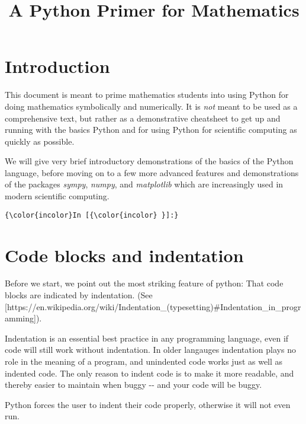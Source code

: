\documentclass{report}
\title{A Python Primer for Mathematics}
\begin{document}
    
    
    \maketitle
    
    
    \tableofcontents


    
\chapter{Introduction}\label{introduction}

This document is meant to prime mathematics students into using Python
for doing mathematics symbolically and numerically. It is \emph{not}
meant to be used as a comprehensive text, but rather as a demonstrative
cheatsheet to get up and running with the basics Python and for using
Python for scientific computing as quickly as possible.

We will give very brief introductory demonstrations of the basics of the
Python language, before moving on to a few more advanced features and
demonstrations of the packages \emph{sympy}, \emph{numpy}, and
\emph{matplotlib} which are increasingly used in modern scientific
computing.

    \begin{Verbatim}[commandchars=\\\{\}]
{\color{incolor}In [{\color{incolor} }]:} 
\end{Verbatim}

\chapter{Code blocks and indentation}\label{code-blocks-and-indentation}

Before we start, we point out the most striking feature of python: That
code blocks are indicated by indentation. (See
{[}https://en.wikipedia.org/wiki/Indentation\_(typesetting)\#Indentation\_in\_programming{]}).

Indentation is an essential best practice in any programming language,
even if code will still work without indentation. In older langauges
indentation plays no role in the meaning of a program, and unindented
code works just as well as indented code. The only reason to indent code
is to make it more readable, and thereby easier to maintain when buggy
-\/- and your code will be buggy.

Python forces the user to indent their code properly, otherwise it will
not even run.
\end{document}
